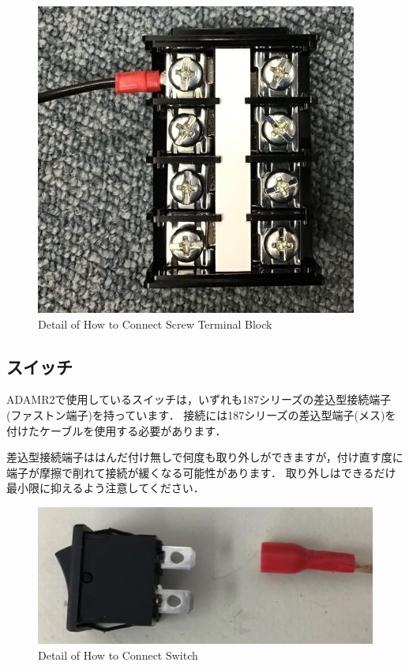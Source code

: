 \documentclass[{../../master}]{subfiles}
\begin{document}
  \begin{figure}[ht]
    \centering
    \includegraphics[width=65truemm, clip]{images/terminal.jpg}
    \caption{Detail of How to Connect Screw Terminal Block}
    \label{fig:terminal}
  \end{figure}

  \subsection{スイッチ}
  ADAMR2で使用しているスイッチは，いずれも187シリーズの差込型接続端子(ファストン端子)を持っています．
  接続には187シリーズの差込型端子(メス)を付けたケーブルを使用する必要があります．

  差込型接続端子ははんだ付け無しで何度も取り外しができますが，付け直す度に端子が摩擦で削れて接続が緩くなる可能性があります．
  取り外しはできるだけ最小限に抑えるよう注意してください．

  \begin{figure}[ht]
    \centering
    \includegraphics[width=65truemm, clip]{images/switch.jpg}
    \caption{Detail of How to Connect Switch}
    \label{fig:switch}
  \end{figure}
\end{document}
